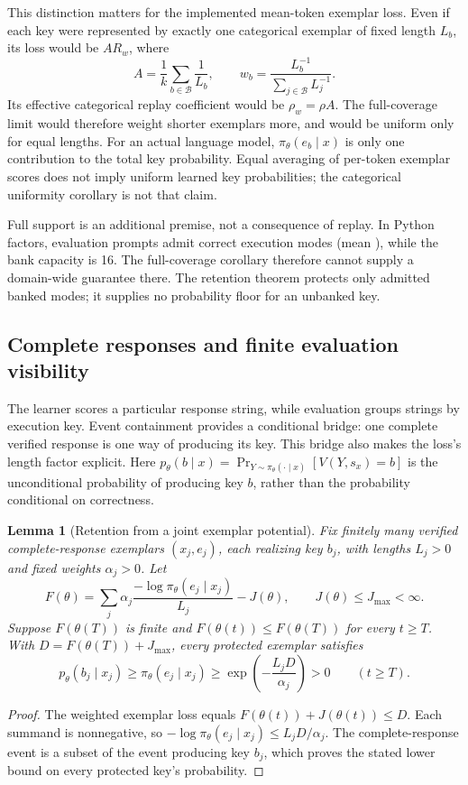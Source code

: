 \documentclass{article}
\newcommand{\1}{\mathbf 1}
\newtheorem{lemma}{Lemma}[section]
\theoremstyle{remark}
\theoremstyle{definition}
\theoremstyle{plain}
\begin{document}
This distinction matters for the implemented mean-token exemplar loss.
Even if each key were represented by exactly one categorical exemplar of
fixed length $L_b$, its loss would be $A R_w$, where
\[
 A=\frac1k\sum_{b\in\mathcal B}\frac1{L_b},\qquad
 w_b=\frac{L_b^{-1}}{\sum_{j\in\mathcal B}L_j^{-1}}.
\]
Its effective categorical replay coefficient would be $\rho_w=\rho A$.
The full-coverage limit would therefore weight shorter exemplars more, and
would be uniform only for equal lengths. For an actual language model,
$\pi_\theta(e_b\mid x)$ is only one contribution to the total key probability.
Equal averaging of per-token exemplar scores does not imply uniform learned
key probabilities; the categorical uniformity corollary is not that claim.

Full support is an additional premise, not a consequence of replay. In
Python factors, evaluation prompts admit \MDvmPythonRange{} correct execution
modes (mean \MDvmPythonMean{}), while the bank capacity is 16. The
full-coverage corollary therefore cannot supply a domain-wide guarantee there. The retention theorem protects only
admitted banked modes; it supplies no probability floor for an unbanked key.

\subsection{Complete responses and finite evaluation visibility}
\label{app:theory-exemplar-bridge}

The learner scores a particular response string, while evaluation groups
strings by execution key. Event containment provides a conditional bridge:
one complete verified response is one way of producing its key. This bridge
also makes the loss's length factor explicit. Here
$p_\theta(b\mid x)=\Pr_{Y\sim\pi_\theta(\cdot\mid x)}[V(Y,s_x)=b]$
is the unconditional probability of producing key $b$, rather than the
probability conditional on correctness.

\begin{lemma}[Retention from a joint exemplar potential]
\label{lem:shared-exemplar-retention}
Fix finitely many verified complete-response exemplars $(x_j,e_j)$, each
realizing key $b_j$, with lengths $L_j>0$ and fixed weights $\alpha_j>0$.
Let
\[
 F(\theta)=\sum_j\alpha_j
 \frac{-\log\pi_\theta(e_j\mid x_j)}{L_j}-J(\theta),
 \qquad J(\theta)\le J_{\max}<\infty.
\]
Suppose $F(\theta(T))$ is finite and
$F(\theta(t))\le F(\theta(T))$ for every $t\ge T$. With
$D=F(\theta(T))+J_{\max}$, every protected exemplar satisfies
\[
 p_\theta(b_j\mid x_j)\ge\pi_\theta(e_j\mid x_j)
 \ge\exp\!\left(-\frac{L_jD}{\alpha_j}\right)>0
 \qquad(t\ge T).
\]
\end{lemma}
\begin{proof}
The weighted exemplar loss equals $F(\theta(t))+J(\theta(t))\le D$.
Each summand is nonnegative, so
$-\log\pi_\theta(e_j\mid x_j)\le L_jD/\alpha_j$.
The complete-response event is a subset of the event producing key $b_j$,
which proves the stated lower bound on every protected key's probability.
\end{proof}
\end{document}
